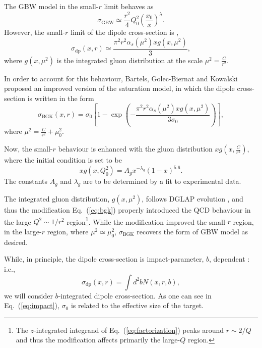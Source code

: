 \documentclass[11pt]{article}
\begin{document}
The GBW model in the small-$r$ limit behaves as 
\begin{equation}
\sigma_{\mathrm{GBW}}\simeq\frac{r^2}{4} Q_0^2\left(\frac{x_0}{x}\right)^{\lambda}.
\end{equation}
However, the small-$r$ limit of the dipole cross-section is \cite{bgk2002}, 
\begin{equation}
\sigma_{\mathrm{dp}}(x,r)\simeq \frac{\pi^2 r^2\alpha_s(\mu^2) x g(x,\mu^2)}{3},
\end{equation}
where $g(x,\mu^2)$ is the integrated gluon distribution at the scale $\mu^2=\frac{C}{r^2}$.

In order to account for this behaviour, Bartels, Golec-Biernat and Kowalski \cite{bgk2002} proposed an improved version of the saturation model, in which the dipole cross-section is written in the form
\begin{equation}
\sigma_{\mathrm{BGK}} (x,r)=\sigma_0 \left[ 1-\exp\left( - \frac{\pi^2 r^2\alpha_s(\mu^2) x g(x,\mu^2)}{3 \sigma_0} \right) \right],
\label{eq:bgk}
\end{equation}
where $\mu^2=\frac{C}{r^2} + \mu_0^2$.

Now, the small-$r$ behaviour is enhanced with the gluon distribution $x g(x, \frac{C}{r^2})$, where the initial condition is set to be \cite{bgk2002}
\begin{equation}
x g(x,Q_0^2)=A_g x^{-\lambda_g} (1-x)^{5.6}.
\end{equation}
The constants $A_g$ and $\lambda_g$ are to be determined by a fit to experimental data.

The integrated gluon distribution, $g(x,\mu^2)$, follows DGLAP evolution \cite{gbs2018},
and thus the modification Eq.~(\ref{eq:bgk}) properly introduced the QCD behaviour in the large $Q^2\sim1/r^2$ region\footnote{The $z$-integrated integrand of Eq.~(\ref{eq:factorization}) peaks around $r\sim2/Q$ and thus the modification affects primarily the large-$Q$ region. }. 
While the modification improved the small-$r$ region, %
in the large-$r$ region, where $\mu^2\simeq \mu_0^2$, $\sigma_{\mathrm{BGK}}$ recovers the form of GBW model as desired.  

While, in principle, the dipole cross-section is impact-parameter, $b$, dependent \cite{impact}:\\
i.e.,
\begin{equation}
\sigma_{\mathrm{dp}}(x,r)=\int d^2b N(x,r,b),
\label{eq:impact}
\end{equation} 
we will consider $b$-integrated dipole cross-section.
As one can see in Eq.~(\ref{eq:impact}), $\sigma_0$ is related to the effective size of the target.%
\end{document}
